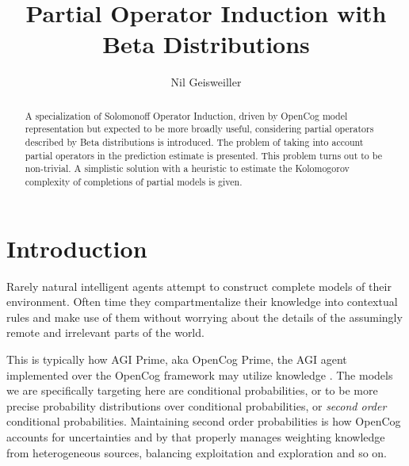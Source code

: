 \documentclass[runningheads]{llncs}
\begin{document}
%
\title{Partial Operator Induction with Beta Distributions}
%
%
\author{Nil Geisweiller}
%
%
%
\maketitle              %
%
\begin{abstract}
  A specialization of Solomonoff Operator Induction, driven by OpenCog
  model representation but expected to be more broadly useful,
  considering partial operators described by Beta distributions is
  introduced. The problem of taking into account partial operators in
  the prediction estimate is presented. This problem turns out to be
  non-trivial. A simplistic solution with a heuristic to estimate the
  Kolomogorov complexity of completions of partial models is given.

\end{abstract}
%
%
%
\section{Introduction}
Rarely natural intelligent agents attempt to construct complete models
of their environment. Often time they compartmentalize their knowledge
into contextual rules and make use of them without worrying about the
details of the assumingly remote and irrelevant parts of the world.

This is typically how AGI Prime, aka OpenCog Prime, the AGI agent
implemented over the OpenCog framework may utilize knowledge
\cite{Goertzel15Speculative}. The models we are specifically targeting
here are conditional probabilities, or to be more precise probability
distributions over conditional probabilities, or \emph{second order}
conditional probabilities. Maintaining second order probabilities is
how OpenCog accounts for uncertainties \cite{Ikle08Probabilistic} and
by that properly manages weighting knowledge from heterogeneous
sources, balancing exploitation and exploration and so on.
\end{document}
